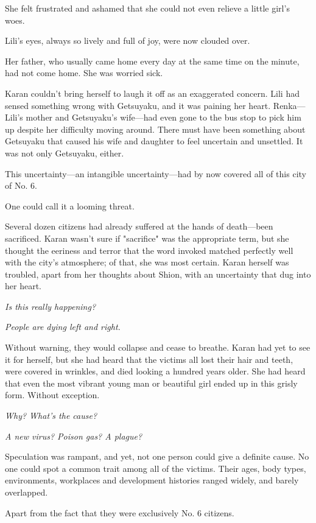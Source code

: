 She felt frustrated and ashamed that she could not even relieve a little
girl's woes.

Lili's eyes, always so lively and full of joy, were now clouded over.

Her father, who usually came home every day at the same time on the
minute, had not come home. She was worried sick.

Karan couldn't bring herself to laugh it off as an exaggerated concern.
Lili had sensed something wrong with Getsuyaku, and it was paining her
heart. Renka---Lili's mother and Getsuyaku's wife---had even gone to the bus
stop to pick him up despite her difficulty moving around. There must
have been something about Getsuyaku that caused his wife and daughter to
feel uncertain and unsettled. It was not only Getsuyaku, either.

This uncertainty---an intangible uncertainty---had by now covered all of
this city of No. 6.

One could call it a looming threat.

Several dozen citizens had already suffered at the hands of death---been
sacrificed. Karan wasn't sure if "sacrifice" was the appropriate term,
but she thought the eeriness and terror that the word invoked matched
perfectly well with the city's atmosphere; of that, she was most
certain. Karan herself was troubled, apart from her thoughts about
Shion, with an uncertainty that dug into her heart.

\emph{Is this really happening?}

\emph{People are dying left and right.}

Without warning, they would collapse and cease to breathe. Karan had yet
to see it for herself, but she had heard that the victims all lost their
hair and teeth, were covered in wrinkles, and died looking a hundred
years older. She had heard that even the most vibrant young man or
beautiful girl ended up in this grisly form. Without exception.

\emph{Why? What's the cause?}

\emph{A new virus? Poison gas? A plague?}

Speculation was rampant, and yet, not one person could give a definite
cause. No one could spot a common trait among all of the victims. Their
ages, body types, environments, workplaces and development histories
ranged widely, and barely overlapped.

Apart from the fact that they were exclusively No. 6 citizens.

